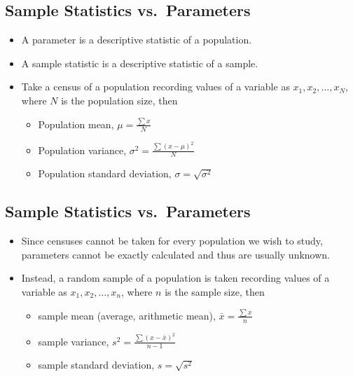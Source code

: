 \documentclass[
  letterpaper,
  DIV=11,
  numbers=noendperiod]{scrartcl}
\begin{document}
\subsection{Sample Statistics
vs.~Parameters}\label{sample-statistics-vs.-parameters}

\begin{itemize}
\item
  A {parameter} is a descriptive statistic of a population.
\item
  A {sample statistic} is a descriptive statistic of a sample.
\item
  Take a {census} of a population recording values of a variable as
  \(x_1, x_2,\ldots,x_N\), where \(N\) is the population size, then

  \begin{itemize}
  \item
    Population mean, \(\mu=\frac{\textstyle\sum x}{N}\)
  \item
    Population variance, \(\sigma^2=\frac{\textstyle\sum (x-\mu)^2}{N}\)
  \item
    Population standard deviation, \(\sigma=\sqrt{\sigma^2}\)
  \end{itemize}
\end{itemize}

\subsection{Sample Statistics
vs.~Parameters}\label{sample-statistics-vs.-parameters-1}

\begin{itemize}
\item
  Since censuses cannot be taken for every population we wish to study,
  parameters cannot be exactly calculated and thus are usually unknown.
\item
  Instead, a {random sample} of a population is taken recording values
  of a variable as \(x_1, x_2,\ldots,x_n\), where \(n\) is the sample
  size, then

  \begin{itemize}
  \item
    sample mean (average, arithmetic mean),
    \(\bar{x}= \frac{\textstyle \sum x}{n}\)
  \item
    sample variance, \(s^2=\frac{\textstyle \sum (x-\bar{x})^2}{n-1}\)
  \item
    sample standard deviation, \(s=\sqrt{s^2}\)
  \end{itemize}
\end{itemize}
\end{document}

